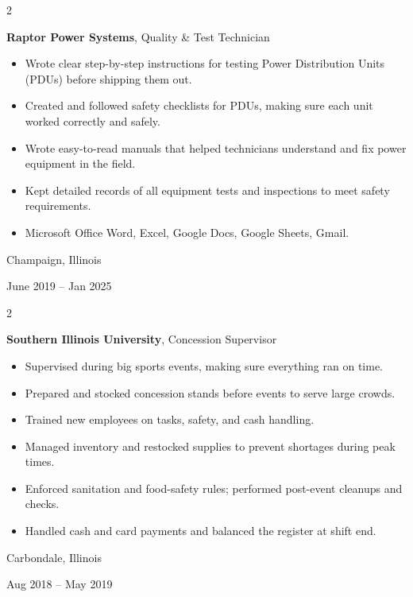 \documentclass[10pt, letterpaper]{article}
\newenvironment{highlights}{
    \begin{itemize}[
        topsep=0.10 cm,
        parsep=0.10 cm,
        partopsep=0pt,
        itemsep=0pt,
        leftmargin=0.4 cm + 10pt
    ]
}{
    \end{itemize}
} %
\newenvironment{twocolentry}[2][]{
    \onecolentry
    \def\secondColumn{#2}
    \setcolumnwidth{\fill, 4.5 cm}
    \begin{paracol}{2}
}{
    \switchcolumn \raggedleft \secondColumn
    \end{paracol}
    \endonecolentry
} %
\begin{document}
        
        \begin{twocolentry}{
            Champaign, Illinois

        June 2019 – Jan 2025
        }
            \textbf{Raptor Power Systems}, Quality \& Test Technician
            \begin{highlights}
                \item Wrote clear step-by-step instructions for testing Power Distribution Units (PDUs) before shipping them out.
                \item Created and followed safety checklists for PDUs, making sure each unit worked correctly and safely.
                \item Wrote easy-to-read manuals that helped technicians understand and fix power equipment in the field.
                \item Kept detailed records of all equipment tests and inspections to meet safety requirements.
                \item Microsoft Office Word, Excel, Google Docs, Google Sheets, Gmail.
            \end{highlights}
        \end{twocolentry}


        \vspace{0.2 cm}

        \begin{twocolentry}{
            Carbondale, Illinois

        Aug 2018 – May 2019
        }
            \textbf{Southern Illinois University}, Concession Supervisor
            \begin{highlights}
                \item Supervised during big sports events, making sure everything ran on time.
                \item Prepared and stocked concession stands before events to serve large crowds.
                \item Trained new employees on tasks, safety, and cash handling.
                \item Managed inventory and restocked supplies to prevent shortages during peak times.
                \item Enforced sanitation and food-safety rules; performed post-event cleanups and checks.
                \item Handled cash and card payments and balanced the register at shift end.
            \end{highlights}
        \end{twocolentry}
\end{document}
